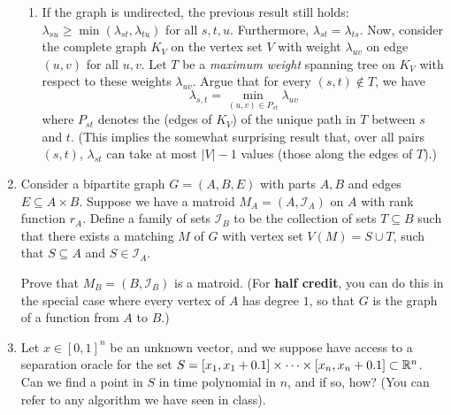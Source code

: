 \documentclass[12pt]{article}
\begin{document}
\begin{enumerate}
\begin{enumerate}
\item If the graph is undirected, the previous result still holds: $\lambda_{su} \geq \min(\lambda_{st},\lambda_{tu})$ for all $s, t, u$. Furthermore, $\lambda_{st}=\lambda_{ts}$. Now, consider the complete graph $K_V$ on the vertex set $V$ with weight $\lambda_{uv}$ on edge $(u,v)$ for all $u,v$. Let $T$ be a {\it maximum weight} spanning tree on $K_V$ with respect to these weights $\lambda_{uv}$. Argue that for every $(s,t)\notin T$, we have $$\lambda_{s,t}=\min_{(u,v)\in P_{st}} \lambda_{uv}$$ where $P_{st}$ denotes the (edges of $K_V$) of the unique path in $T$ between $s$ and $t$. (This implies the somewhat surprising result that, over all pairs $(s,t)$, $\lambda_{st}$ can take at most $|V|-1$ values (those along the edges of $T$).)
\end{enumerate}




\newpage


\item


Consider a bipartite graph $G = (A,B,E)$ with parts $A,B$ and edges $E \subseteq A\times B$. Suppose we have a matroid $M_A = (A,\mathcal{I}_A)$ on $A$ with rank function $r_A$. Define a family of sets $\mathcal{I}_B$ to be the collection of sets $T \subseteq B$ such that there exists a matching $M$ of $G$ with vertex set $V(M) = S\cup T$, such that $S \subseteq A$ and $S \in \mathcal{I}_A$.

 Prove that $M_B = (B,\mathcal{I}_B)$ is a matroid. (For {\bf half credit}, you can do this in the special case where every vertex of $A$ has degree $1$, so that $G$ is the graph of a function from $A$ to $B$.)




\newpage

\item Let $x \in [0,1]^n$ be an unknown vector, and we suppose have access to a separation oracle for the set $S = [x_1, x_1 + 0.1] \times  \dots \times [x_n, x_n + 0.1] \subset {\mathbb R}^n$. Can we find a point in $S$ in time polynomial in $n$, and if so, how? (You can refer to any algorithm we have seen in class).










\end{enumerate}

\end{document}
